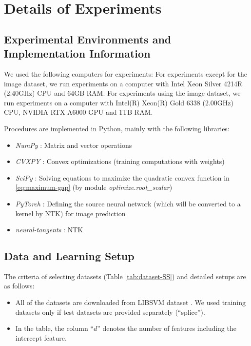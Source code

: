 \section{Details of Experiments}


\subsection{Experimental Environments and Implementation Information} \label{app:implementation}

We used the following computers for experiments:
For experiments except for the image dataset,
we run experiments on a computer with Intel Xeon Silver 4214R (2.40GHz) CPU and 64GB RAM.
For experiments using the image dataset,
we run experiments on a computer with Intel(R) Xeon(R) Gold 6338 (2.00GHz) CPU, NVIDIA RTX A6000 GPU and 1TB RAM.

Procedures are implemented in Python, mainly with the following libraries:
\begin{itemize}
\item {\em NumPy} \citep{harris2020array}: Matrix and vector operations
\item {\em CVXPY} \citep{diamond2016cvxpy}: Convex optimizations (training computations with weights)
\item {\em SciPy} \citep{2020SciPy-NMeth}: Solving equations to maximize the quadratic convex function in \eqref{eq:maximum-gap} (by module {\em optimize.root\_scalar})
\item {\em PyTorch} \citep{paszke2017automatic}: Defining the source neural network (which will be converted to a kernel by NTK) for image prediction
\item {\em neural-tangents} \citep{neuraltangents2020}: NTK
\end{itemize}

\subsection{Data and Learning Setup} \label{app:experimental-setup}

The criteria of selecting datasets (Table \ref{tab:dataset-SS}) and detailed setups are as follows:
\begin{itemize}
\item All of the datasets are downloaded from LIBSVM dataset \citep{libsvmDataset}.
	We used training datasets only if test datasets are provided separately
	(``splice'').
\item In the table, the column ``$d$'' denotes the number of features including the intercept feature.
\end{itemize}

